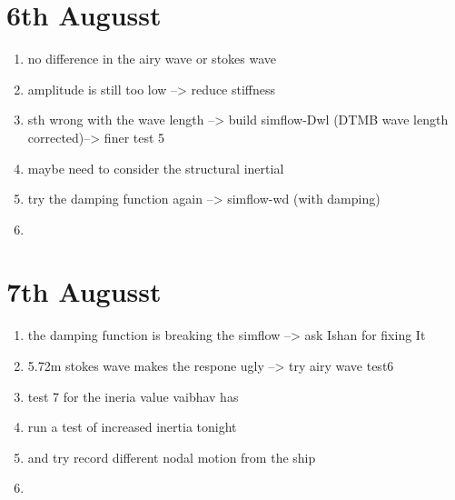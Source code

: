 \documentclass[12pt]{article} %
\begin{document}
\section{6th Augusst}
\begin{enumerate}
        \item no difference in the airy wave or stokes wave
        \item amplitude is still too low --> reduce stiffness
        \item sth wrong with the wave length --> build simflow-Dwl (DTMB wave length corrected)--> finer test 5
        \item maybe need to consider the structural inertial
        \item try the damping function again --> simflow-wd (with damping)
        \item 
\end{enumerate} 
\section{7th Augusst}
\begin{enumerate}
        \item the damping function is breaking the simflow --> ask Ishan for fixing It
        \item 5.72m stokes wave makes the respone ugly --> try airy wave test6
        \item test 7 for the ineria value vaibhav has
        \item run a test of increased inertia tonight
        \item and try record different nodal motion from the ship
        \item 
\end{enumerate} 
\end{document}
